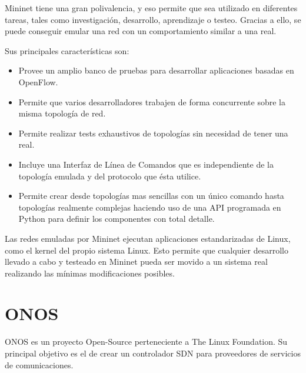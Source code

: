 Mininet tiene una gran polivalencia, y eso permite que sea utilizado en diferentes tareas, tales como investigación, desarrollo, aprendizaje o testeo. Gracias a ello, se puede conseguir emular una red con un comportamiento similar a una real.

Sus principales características son:
\begin{itemize}
	\item Provee un amplio banco de pruebas para desarrollar aplicaciones basadas en OpenFlow.
	
	\item Permite que varios desarrolladores trabajen de forma concurrente sobre la misma topología de red.
	
	\item Permite realizar tests exhaustivos de topologías sin necesidad de tener una real.
	
	\item Incluye una Interfaz de Línea de Comandos que es independiente de la topología emulada y del protocolo que ésta utilice.
	
	\item Permite crear desde topologías mas sencillas con un único comando hasta topologías realmente complejas haciendo uso de una \ac{API} programada en Python para definir los componentes con total detalle.
\end{itemize}

Las redes emuladas por Mininet ejecutan aplicaciones estandarizadas de Linux, como el kernel del propio sistema Linux. Esto permite que cualquier desarrollo llevado a cabo y testeado en Mininet pueda ser movido a un sistema real realizando las mínimas modificaciones posibles.

\section{ONOS}
\label{sec:onos}

\ac{ONOS}\cite{onosbib} es un proyecto Open-Source perteneciente a The Linux Foundation. Su principal objetivo es el de crear un controlador \ac{SDN} para proveedores de servicios de comunicaciones.

